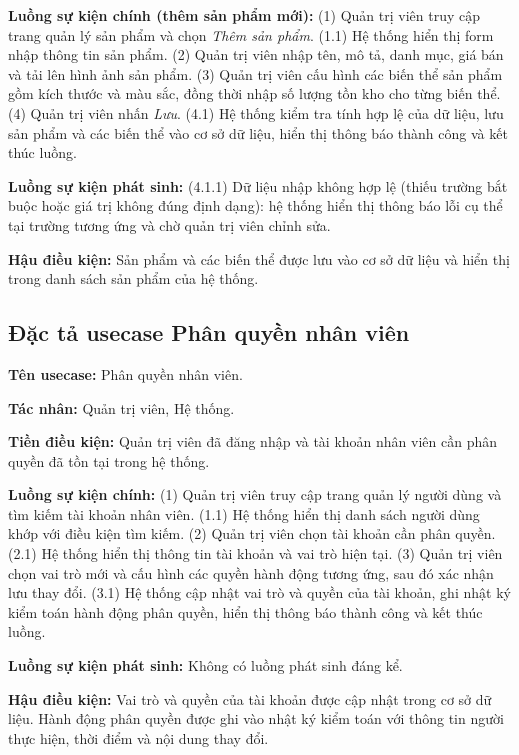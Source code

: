 \documentclass[../DoAn.tex]{subfiles}
\begin{document}
  \textbf{Luồng sự kiện chính (thêm sản phẩm mới):}
  (1) Quản trị viên truy cập trang quản lý sản phẩm và chọn \textit{Thêm sản phẩm}.
  (1.1) Hệ thống hiển thị form nhập thông tin sản phẩm.
  (2) Quản trị viên nhập tên, mô tả, danh mục, giá bán và tải lên hình ảnh sản phẩm.
  (3) Quản trị viên cấu hình các biến thể sản phẩm gồm kích thước và màu sắc, đồng
  thời nhập số lượng tồn kho cho từng biến thể.
  (4) Quản trị viên nhấn \textit{Lưu}.
  (4.1) Hệ thống kiểm tra tính hợp lệ của dữ liệu, lưu sản phẩm và các biến thể
  vào cơ sở dữ liệu, hiển thị thông báo thành công và kết thúc luồng.

  \textbf{Luồng sự kiện phát sinh:}
  (4.1.1) Dữ liệu nhập không hợp lệ (thiếu trường bắt buộc hoặc giá trị không đúng
  định dạng): hệ thống hiển thị thông báo lỗi cụ thể tại trường tương ứng và chờ
  quản trị viên chỉnh sửa.

  \textbf{Hậu điều kiện:} Sản phẩm và các biến thể được lưu vào cơ sở dữ liệu và
  hiển thị trong danh sách sản phẩm của hệ thống.

  \subsection{Đặc tả usecase Phân quyền nhân viên}
  \label{subsection:2.3.4}
  \hfill
  
  \textbf{Tên usecase:} Phân quyền nhân viên.

  \textbf{Tác nhân:} Quản trị viên, Hệ thống.

  \textbf{Tiền điều kiện:} Quản trị viên đã đăng nhập và tài khoản nhân viên cần
  phân quyền đã tồn tại trong hệ thống.

  \textbf{Luồng sự kiện chính:}
  (1) Quản trị viên truy cập trang quản lý người dùng và tìm kiếm tài khoản nhân viên.
  (1.1) Hệ thống hiển thị danh sách người dùng khớp với điều kiện tìm kiếm.
  (2) Quản trị viên chọn tài khoản cần phân quyền.
  (2.1) Hệ thống hiển thị thông tin tài khoản và vai trò hiện tại.
  (3) Quản trị viên chọn vai trò mới và cấu hình các quyền hành động tương ứng, sau
  đó xác nhận lưu thay đổi.
  (3.1) Hệ thống cập nhật vai trò và quyền của tài khoản, ghi nhật ký kiểm toán
  hành động phân quyền, hiển thị thông báo thành công và kết thúc luồng.

  \textbf{Luồng sự kiện phát sinh:} Không có luồng phát sinh đáng kể.

  \textbf{Hậu điều kiện:} Vai trò và quyền của tài khoản được cập nhật trong cơ sở
  dữ liệu. Hành động phân quyền được ghi vào nhật ký kiểm toán với thông tin người
  thực hiện, thời điểm và nội dung thay đổi.
\end{document}
